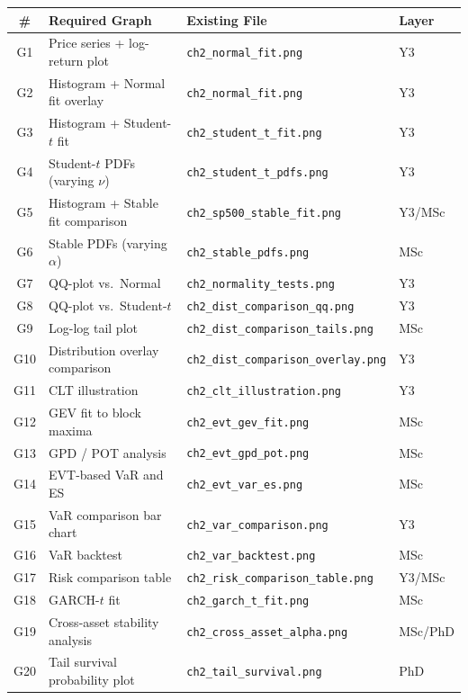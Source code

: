 \documentclass[11pt, a4paper]{article}
\theoremstyle{definition}
\begin{document}
\begin{center}
\renewcommand{\arraystretch}{1.4}
\begin{tabular}{c l l l}
\toprule
\textbf{\#} & \textbf{Required Graph} & \textbf{Existing File} & \textbf{Layer} \\
\midrule
G1 & Price series + log-return plot & \texttt{ch2\_normal\_fit.png} & Y3 \\
G2 & Histogram + Normal fit overlay & \texttt{ch2\_normal\_fit.png} & Y3 \\
G3 & Histogram + Student-$t$ fit & \texttt{ch2\_student\_t\_fit.png} & Y3 \\
G4 & Student-$t$ PDFs (varying $\nu$) & \texttt{ch2\_student\_t\_pdfs.png} & Y3 \\
G5 & Histogram + Stable fit comparison & \texttt{ch2\_sp500\_stable\_fit.png} & Y3/MSc \\
G6 & Stable PDFs (varying $\alpha$) & \texttt{ch2\_stable\_pdfs.png} & MSc \\
G7 & QQ-plot vs.\ Normal & \texttt{ch2\_normality\_tests.png} & Y3 \\
G8 & QQ-plot vs.\ Student-$t$ & \texttt{ch2\_dist\_comparison\_qq.png} & Y3 \\
G9 & Log-log tail plot & \texttt{ch2\_dist\_comparison\_tails.png} & MSc \\
G10 & Distribution overlay comparison & \texttt{ch2\_dist\_comparison\_overlay.png} & Y3 \\
G11 & CLT illustration & \texttt{ch2\_clt\_illustration.png} & Y3 \\
G12 & GEV fit to block maxima & \texttt{ch2\_evt\_gev\_fit.png} & MSc \\
G13 & GPD / POT analysis & \texttt{ch2\_evt\_gpd\_pot.png} & MSc \\
G14 & EVT-based VaR and ES & \texttt{ch2\_evt\_var\_es.png} & MSc \\
G15 & VaR comparison bar chart & \texttt{ch2\_var\_comparison.png} & Y3 \\
G16 & VaR backtest & \texttt{ch2\_var\_backtest.png} & MSc \\
G17 & Risk comparison table & \texttt{ch2\_risk\_comparison\_table.png} & Y3/MSc \\
G18 & GARCH-$t$ fit & \texttt{ch2\_garch\_t\_fit.png} & MSc \\
G19 & Cross-asset stability analysis & \texttt{ch2\_cross\_asset\_alpha.png} & MSc/PhD \\
G20 & Tail survival probability plot & \texttt{ch2\_tail\_survival.png} & PhD \\
\bottomrule
\end{tabular}
\end{center}
\end{document}
